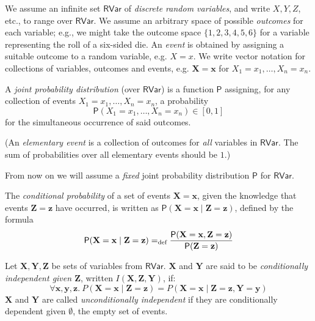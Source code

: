 \documentclass[envcountsame,envcountsect]{llncs}
\renewcommand{\vec}[1]{\mathbf{#1}}
\newcommand{\defeq}{=_{\textrm{\scriptsize{def}}}}
\newcommand{\rvar}{\mathsf{RVar}}
\newcommand{\false}{\bot}
\newcommand{\true}{\top}
\newcommand{\prob}{\mathsf{P}}
\newcommand{\indep}[3]{I({#1},{#2},{#3})}
\theoremstyle{plain}
\begin{document}
We assume an infinite set $\rvar$ of \emph{discrete random variables}, and write $X,Y,Z$, etc., to range over $\rvar$. We assume an arbitrary space of possible \emph{outcomes} for each variable; e.g., we might take the outcome space $\{1,2,3,4,5,6\}$ for a variable representing the roll of a six-sided die. An \emph{event} is obtained by assigning a suitable outcome to a random variable, e.g. $X=x$. We write vector notation for collections of variables, outcomes and events, e.g. $\vec{X}=\vec{x}$ for $X_1=x_1,\ldots,X_n=x_n$.



\begin{definition}
\label{defn:joint_prob_distr}
A \emph{joint probability distribution} (over $\rvar$) is a function $\prob$ assigning, for any collection of events $X_1=x_1,\ldots,X_n=x_n$, a probability
\[
\prob(X_1=x_1,\ldots,X_n=x_n) \in [0,1]
\]
for the simultaneous occurrence of said outcomes.

(An \emph{elementary event} is a collection of outcomes for \emph{all} variables in $\rvar$.  The sum of probabilities over all elementary events should be $1$.)
\end{definition}

From now on we will assume a \emph{fixed} joint probability distribution $\prob$ for $\rvar$.

\begin{definition}
\label{defn:cond_prob}
The \emph{conditional probability} of a set of events $\vec{X}=\vec{x}$, given the knowledge that events $\vec{Z}=\vec{z}$ have occurred, is written as $\prob(\vec{X}=\vec{x} \mid \vec{Z}=\vec{z})$, defined by the formula
\begin{equation}
\label{eqn:cond_prob}
\prob(\vec{X}=\vec{x} \mid \vec{Z}=\vec{z}) \defeq \frac{\prob(\vec{X}=\vec{x},\vec{Z}=\vec{z})}{\prob(\vec{Z}=\vec{z})}
\end{equation}
\end{definition}


\begin{definition}
\label{defn:cond_indep}
Let $\vec{X},\vec{Y},\vec{Z}$ be sets of variables from $\rvar$.  $\vec{X}$ and $\vec{Y}$ are said to be \emph{conditionally independent given $\vec{Z}$}, written $\indep{\vec{X}}{\vec{Z}}{\vec{Y}}$, if:
\begin{equation}
\forall \vec{x},\vec{y},\vec{z}.\ P(\vec{X} = \vec{x} \mid \vec{Z} = \vec{z}) = P(\vec{X} = \vec{x} \mid \vec{Z} = \vec{z}, \vec{Y}=\vec{y})
\end{equation}
$\vec{X}$ and $\vec{Y}$ are called \emph{unconditionally independent} if they are conditionally dependent given $\emptyset$, the empty set of events.
\end{definition}
\end{document}
